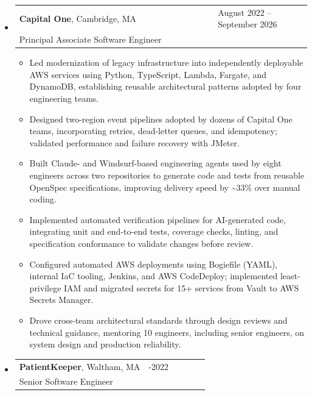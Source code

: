 \documentclass[10pt]{article}
\begin{document}
  \begin{itemize}


    \item
    \begin{tabular}{p{0.68\linewidth}p{0.32\linewidth}}
      \textbf{Capital One}, Cambridge, MA & \raggedleft August 2022 – September 2026 \tabularnewline
      \multicolumn{2}{l}{Principal Associate Software Engineer}
    \end{tabular}
    \begin{itemize}

      \item Led modernization of legacy infrastructure into independently deployable AWS services using Python, TypeScript, Lambda, Fargate, and DynamoDB, establishing reusable architectural patterns adopted by four engineering teams.

      \item Designed two-region event pipelines adopted by dozens of Capital One teams, incorporating retries, dead-letter queues, and idempotency; validated performance and failure recovery with JMeter.

      \item Built Claude- and Windsurf-based engineering agents used by eight engineers across two repositories to generate code and tests from reusable OpenSpec specifications, improving delivery speed by \textasciitilde{}33\% over manual coding.

      \item Implemented automated verification pipelines for AI-generated code, integrating unit and end-to-end tests, coverage checks, linting, and specification conformance to validate changes before review.

      \item Configured automated AWS deployments using Bogiefile (YAML), internal IaC tooling, Jenkins, and AWS CodeDeploy; implemented least-privilege IAM and migrated secrets for 15+ services from Vault to AWS Secrets Manager.

      \item Drove cross-team architectural standards through design reviews and technical guidance, mentoring 10 engineers, including senior engineers, on system design and production reliability.

    \end{itemize}

    \item
    \begin{tabular}{p{0.68\linewidth}p{0.32\linewidth}}
      \textbf{PatientKeeper}, Waltham, MA & \raggedleft 2019-2022 \tabularnewline
      \multicolumn{2}{l}{Senior Software Engineer}
    \end{tabular}
    \begin{itemize}


\end{itemize}
\end{itemize}
\end{document}
